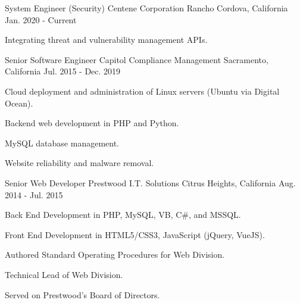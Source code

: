 

\begin{cventries}

  \cventry
	{System Engineer (Security)} %
    {Centene Corporation} %
    {Rancho Cordova, California} %
    {Jan. 2020 - Current} %
    {
      \begin{cvitems} %
        \item {Integrating threat and vulnerability management APIs.}
      \end{cvitems}
    }



  \cventry
    {Senior Software Engineer} %
    {Capitol Compliance Management} %
    {Sacramento, California} %
    {Jul. 2015 - Dec. 2019} %
    {
      \begin{cvitems} %
        \item {Cloud deployment and administration of Linux servers (Ubuntu via Digital Ocean).}
        \item {Backend web development in PHP and Python.}
        \item {MySQL database management.}
        \item {Website reliability and malware removal.}
      \end{cvitems}
    }


  \cventry
    {Senior Web Developer} %
    {Prestwood I.T. Solutions} %
    {Citrus Heights, California} %
    {Aug. 2014 - Jul. 2015} %
    {
      \begin{cvitems} %
        \item {Back End Development in PHP, MySQL, VB, C\#, and MSSQL.}
        \item {Front End Development in HTML5/CSS3, JavaScript (jQuery, VueJS). }
        \item {Authored Standard Operating Procedures for Web Division.}
        \item {Technical Lead of Web Division.}
        \item {Served on Prestwood's Board of Directors.}
      \end{cvitems}
    }


\end{cventries}
